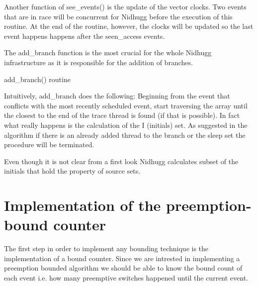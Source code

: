 Another function of see\_events() is the update of the vector clocks. Two events that are in race will be concurrent for Nidhugg before the execution
of this routine. At the end of the routine, however, the clocks will be updated so the last event happens happens after the seen\_access events.

The add\_branch function is the most crucial for the whole Nidhugg infrastructure as it is responsible for the addition of branches.

\begin{algorithm}
    \caption{add\_branch() routine}
\end{algorithm}

Intuitively, add\_branch does the following: Beginning from the event that conflicts with the most recently scheduled event, start traversing
the array until the closest to the end of the trace thread is found (if that is possible). In fact what really happens is the calculation of the
I (initials) set. As suggested in the algorithm if there is an already added thread to the branch or the sleep set the procedure will be terminated.

Even though it is not clear from a first look Nidhugg calculates subset of the initials that hold the property of source sets.

\section{Implementation of the preemption-bound counter}

The first step in order to implement any bounding technique is the implementation of a bound counter. Since we are intrested in implementing
a preemption bounded algorithm we should be able to know the bound count of each event i.e. how many preemptive switches happened until the current 
event. 

